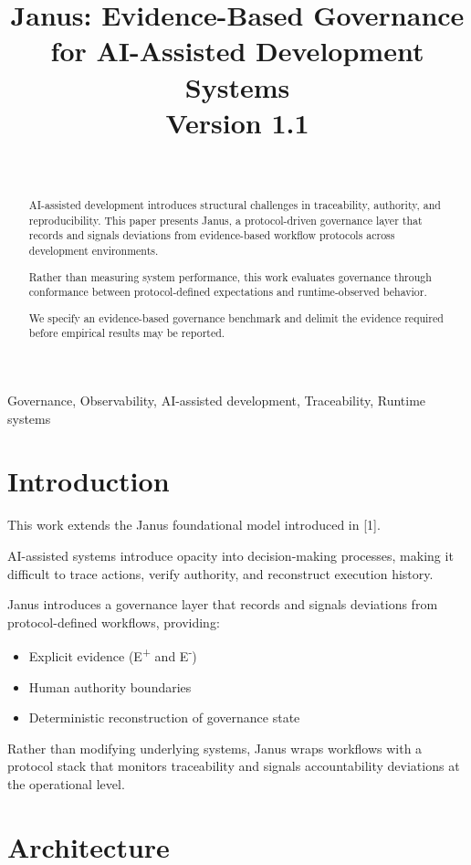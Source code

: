 \documentclass[conference]{IEEEtran}
\title{Janus: Evidence-Based Governance for AI-Assisted Development Systems\\
\large Version 1.1}
\author{%
  \IEEEauthorblockN{Martín Nicolás Sánchez Morales}\\
  \IEEEauthorblockA{Janus Governance Project\\
  Argentina}%
}
\begin{document}
\maketitle

\begin{abstract}
AI-assisted development introduces structural challenges in traceability, authority,
and reproducibility. This paper presents Janus, a protocol-driven governance layer
that records and signals deviations from evidence-based workflow protocols across
development environments.

Rather than measuring system performance, this work evaluates governance through
conformance between protocol-defined expectations and runtime-observed behavior.

We specify an evidence-based governance benchmark and delimit the evidence
required before empirical results may be reported.
\end{abstract}

\begin{IEEEkeywords}
Governance, Observability, AI-assisted development, Traceability, Runtime systems
\end{IEEEkeywords}


\section{Introduction}


This work extends the Janus foundational model introduced in [1].

AI-assisted systems introduce opacity into decision-making processes, making it
difficult to trace actions, verify authority, and reconstruct execution history.

Janus introduces a governance layer that records and signals deviations from
protocol-defined workflows, providing:
\begin{itemize}
    \item Explicit evidence (E\textsuperscript{+} and E\textsuperscript{-})
    \item Human authority boundaries
    \item Deterministic reconstruction of governance state
\end{itemize}

Rather than modifying underlying systems, Janus wraps workflows with a protocol
stack that monitors traceability and signals accountability deviations at the operational level.

\section{Architecture}
\end{document}
